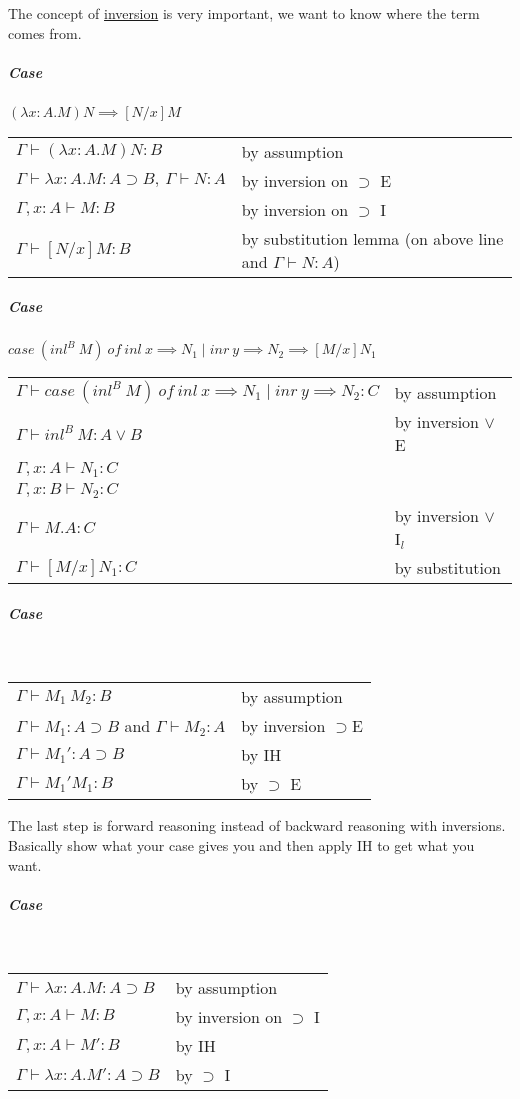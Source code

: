 \documentclass[12 pt]{article}
\begin{document}
    The concept of \underline{inversion} is very important, we want to
    know where the term comes from.
    \subparagraph{Case} $(\lambda x : A.M) N \implies [N/x] M$
    \\\begin{tabular}{l l}
    $\Gamma \vdash (\lambda x : A . M) N : B$ & by assumption
    \\ $\Gamma \vdash \lambda x: A.M : A \supset B,\ \Gamma \vdash N :
    A$ & by inversion on $\supset$ E
    \\ $\Gamma, x : A \vdash M : B$ & by inversion on $\supset$ I
    \\ $\Gamma \vdash [N/x]M:B$ & by substitution lemma (on above line
    and $\Gamma \vdash N:A$)
    \end{tabular}
    \subparagraph{Case} $case\ (inl^B \ M) \ of \ inl\ x \implies N_1
    \mid inr\ y \implies N_2 \implies [M/x] N_1$
    \\\begin{tabular}{l l}
    $\Gamma \vdash case\ (inl^B \ M) \ of \ inl\ x \implies N_1
        \mid inr\ y \implies N_2 : C $ & by assumption
        \\ $\Gamma \vdash inl^B \ M : A \lor B$ & by inversion $\lor$ E
        \\ $\Gamma, x:A \vdash N_1 : C$
        \\ $\Gamma, x:B \vdash N_2 : C$
        \\ $\Gamma \vdash M.A : C$ & by inversion $\lor$ I$_l$
        \\ $\Gamma \vdash [M/x]N_1 : C$ & by substitution
      \end{tabular}
      \subparagraph{Case} 
      \DP
      \\
      \begin{tabular}{l l}
        $\Gamma \vdash M_1 \ M_2 : B$& by assumption
        \\ $\Gamma \vdash M_1 : A \supset B$ and $\Gamma \vdash M_2 : A$ & by inversion $\supset$E
        \\ $\Gamma \vdash M_1' : A \supset B$ & by IH
        \\ $\Gamma \vdash M_1' M_1 : B$ & by $\supset$ E
      \end{tabular}
      The last step is forward reasoning instead of backward reasoning
      with inversions. Basically show what your case gives you and
      then apply IH to get what you want.
      \subparagraph{Case}
      \DP
      \\\begin{tabular}{l l}
        $\Gamma \vdash \lambda x : A . M : A \supset B$& by assumption
          \\ $\Gamma, x : A \vdash M:B$ & by inversion on $\supset$ I
          \\ $\Gamma, x:A \vdash M' : B$ & by IH
          \\ $\Gamma \vdash \lambda x : A . M' : A \supset B$ & by $\supset$ I
        \end{tabular}
\end{document}
